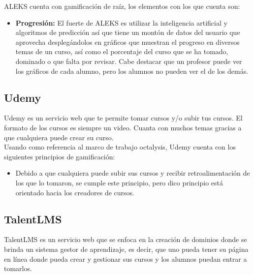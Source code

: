 \begin{multicols*}{2}
    \noindent ALEKS cuenta con gamificación de raíz, los elementos con los que cuenta son:
    
    \begin{itemize}
        \item {\bf Progresión:} El fuerte de ALEKS es utilizar la inteligencia
        artificial y algoritmos de predicción así que tiene un montón de datos del
        usuario que aprovecha desplegándolos en gráficos que muestran el progreso
        en diversos temas de un curso, así como el porcentaje del curso que se ha
        tomado, dominado o que falta por revisar. Cabe destacar que un profesor puede
        ver los gráficos de cada alumno, pero los alumnos no pueden ver el de los demás.
        
    \end{itemize}
    
\vfill\null
\columnbreak
\subsection*{Udemy}

Udemy es un servicio web que te permite tomar cursos y/o subir tus cursos.
El formato de los cursos es siempre un video. Cuanta con muchos temas
gracias a que cualquiera puede crear su curso.\\

    \noindent Usando como referencia al marco de trabajo octalysis,
    Udemy cuenta con los siguientes principios de gamificación:
    
    \begin{itemize}
        \item {\bf \principioIII} Debido a que cualquiera puede subir
        sus cursos y recibir retroalimentación de los que lo tomaron,
        se cumple este principio, pero dico principio está orientado
        hacia los creadores de cursos.
        
    \end{itemize}
    
    
    
\subsection*{TalentLMS}

TalentLMS es un servicio web que se enfoca en la creación de dominios donde se
brinda un sistema gestor de aprendizaje, es decir, que uno pueda tener su página
en línea donde pueda crear y gestionar sus cursos y los alumnos puedan entrar a tomarlos.\\
    

\end{multicols*}
